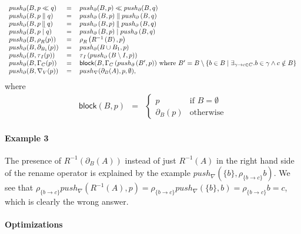 \documentclass{article}
\providecommand{\leftmerge}{\mathbin{\mathrel{\llfloor}}}
\begin{document}
\[\begin{tabular}{lll}
$push_{\partial }(B,p\ll q)$ & $=$ & $push_{\partial }(B,p)\ll
push_{\partial }(B,q)$ \\
$push_{\partial }(B,p\parallel q)$ & $=$ & $push_{\partial }\left(
B,p\right) \parallel push_{\partial }\left( B,q\right) $ \\
$push_{\partial }(B,p\leftmerge q)$ & $=$ & $push_{\partial }\left(
B,p\right) \leftmerge push_{\partial }\left( B,q\right) $ \\
$push_{\partial }(B,p\mid q)$ & $=$ & $push_{\partial }\left( B,p\right)
\mid push_{\partial }\left( B,q\right) $ \\
$push_{\partial }(B,\rho _{R}(p))$ & $=$ & $\rho _{R}\left( R^{-1}\left(
B\right) ,p\right) $ \\
$push_{\partial }(B,\partial _{B_{1}}(p))$ & $=$ & $push_{\partial }(B\cup
B_{1},p)$ \\
$push_{\partial }(B,\tau _{I}(p))$ & $=$ & $\tau _{I}\left( push_{\partial
}\left( B\setminus I,p\right) \right) $ \\
$push_{\partial }(B,\Gamma _{C}(p))$ & $=$ & $\mathsf{block}(B,\Gamma
_{C}\left( push_{\partial }\left( B^{\prime },p\right) \right) $ where $%
B^{\prime }=B\setminus \left\{ b\in B\mid \exists _{\gamma \rightarrow c\in
C}.b\in \gamma \wedge c\notin B\right\} $ \\
$push_{\partial }(B,\nabla _{V}(p))$ & $=$ & $push_{\nabla }(\partial
_{B}(A),p,\emptyset ),$%
\end{tabular}%
\]%
where%
\[
\begin{array}{lll}
\mathsf{block}(B,p) & = & \left\{
\begin{array}{ll}
p & \text{if }B=\emptyset  \\
\partial _{B}(p) & \text{otherwise}%
\end{array}%
\right.
\end{array}%
\]

\paragraph{Example 3}

The presence of $R^{-1}(\partial _{B}(A))$ instead of just $R^{-1}(A)$ in
the right hand side of the rename operator is explained by the example $%
push_{\nabla }(\{b\},\rho _{\{b\rightarrow c\}}b)$. We see that $\rho
_{\{b\rightarrow c\}}push_{\nabla }(R^{-1}(A),p)=\rho _{\{b\rightarrow
c\}}push_{\nabla }(\{b\},b)=\rho _{\{b\rightarrow c\}}b=c$, which is clearly
the wrong answer.

\paragraph{Optimizations}
\end{document}
